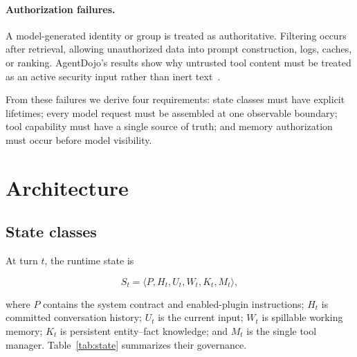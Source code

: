 \documentclass[sigplan,10pt,anonymous,review]{acmart}
\begin{document}
\paragraph{Authorization failures.}
A model-generated identity or group is treated as authoritative.  Filtering
occurs after retrieval, allowing unauthorized data into prompt construction,
logs, caches, or ranking.  AgentDojo's results show why untrusted tool content
must be treated as an active security input rather than inert
text~\cite{debenedetti2024agentdojo}.

From these failures we derive four requirements: state classes must have
explicit lifetimes; every model request must be assembled at one observable
boundary; tool capability must have a single source of truth; and memory
authorization must occur before model visibility.

\section{Architecture}

\subsection{State classes}

At turn $t$, the runtime state is

\begin{equation}
S_t = \langle P, H_t, U_t, W_t, K_t, M_t \rangle ,
\end{equation}

where $P$ contains the system contract and enabled-plugin instructions;
$H_t$ is committed conversation history; $U_t$ is the current input; $W_t$
is spillable working memory; $K_t$ is persistent entity--fact knowledge; and
$M_t$ is the single tool manager.  Table~\ref{tab:state} summarizes their
governance.
\end{document}
